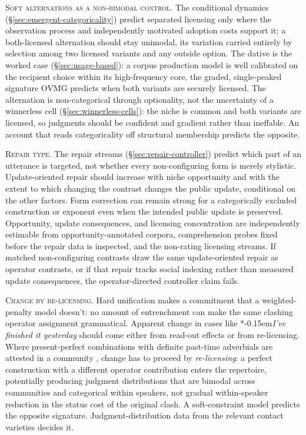 \documentclass[12pt,letterpaper]{article}
\newcommand{\mention}[1]{\textit{#1}}
\newcommand{\judgesep}{\kern-0.15em}
\newcommand{\ungram}[1]{*\judgesep#1}
\begin{document}
\noindent\textsc{Soft alternations as a non-bimodal control.} The conditional
dynamics (\S\ref{sec:emergent-categoricality}) predict separated licensing only
where the observation process and independently motivated adoption costs support
it; a both-licensed
alternation should stay unimodal, its variation carried entirely by selection
among two licensed variants and any outside option. The dative is the worked case
(\S\ref{sec:usage-based}): a corpus
production model is well calibrated on the recipient choice within its
high-frequency core, the graded, single-peaked signature OVMG predicts when
both variants are securely licensed. The alternation is non-categorical
through optionality, not the uncertainty of a winnerless cell
(\S\ref{sec:winnerless-cells}): the niche is common and both variants are
licensed, so judgments should be confident and gradient rather than ineffable.
An account that reads categoricality off structural membership predicts the
opposite.

\noindent\textsc{Repair type.} The repair streams
(\S\ref{sec:repair-controller}) predict which part of an utterance is targeted,
not whether every non-configuring form is merely stylistic. Update-oriented
repair should increase with niche opportunity and with the extent to which
changing the contrast changes the public update, conditional on the other
factors. Form correction can remain strong for a categorically excluded
construction or exponent even when the intended public update is preserved.
Opportunity, update consequences, and licensing concentration are independently estimable from
opportunity-annotated corpora, comprehension probes fixed before the repair
data is inspected, and the non-rating licensing streams. If matched
non-configuring contrasts draw the same update-oriented repair as operator
contrasts, or if that repair tracks social indexing rather than measured update
consequences, the
operator-directed controller claim fails.

\noindent\textsc{Change by re-licensing.} Hard unification makes a commitment
that a weighted-penalty model doesn't: no amount of entrenchment can make the
same clashing operator assignment grammatical. Apparent change in cases like
\ungram{\mention{I've finished it yesterday}} should come either from
read-out effects or from re-licensing. Where present-perfect combinations with
definite past-time adverbials are attested in a community
\autocite{Werner2013DefiniteTemporalAdverbials,
Werner2013TemporalAdverbials}, change has to proceed by
\emph{re-licensing}: a perfect construction with a different operator
contribution enters the repertoire,
potentially producing judgment distributions that are bimodal across communities and
categorical within speakers, not gradual within-speaker reduction in the status
cost of the original clash. A
soft-constraint model predicts the opposite signature. Judgment-distribution
data from the relevant contact varieties decides it.
\end{document}

